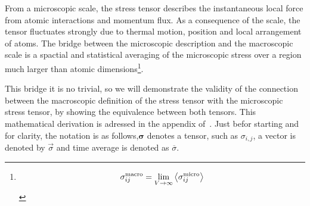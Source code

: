 
From a microscopic scale, the stress tensor describes the instantaneous local force from atomic interactions and momentum flux.
As a consequence of the scale, the tensor fluctuates strongly due to thermal motion, position and local arrangement of atoms.
The bridge between the microscopic description and the macroscopic scale is a spactial and statistical averaging of the microscopic stress over a region much larger than atomic dimensions\footnote{\[\sigma_{ij}^{\mathrm{macro}}=\lim_{V\to\infty}\expval{\sigma_{ij}^{\mathrm{micro}}}\]}.


% 
This bridge it is no trivial, so we will demonstrate the validity of the connection between the macroscopic definition of the stress tensor with the microscopic stress tensor, by showing the equivalence between both tensors.
This mathematical derivation is adressed in the appendix of~\citep{admalUnifiedInterpretationStress2010}.
Just befor starting and for clarity, the notation is as follows,$\bm{\sigma}$ denotes a tensor, such as $\sigma_{i,j}$, a vector is denoted by $\vec{\sigma}$ and time average is denoted as $\overline{\sigma}$.

